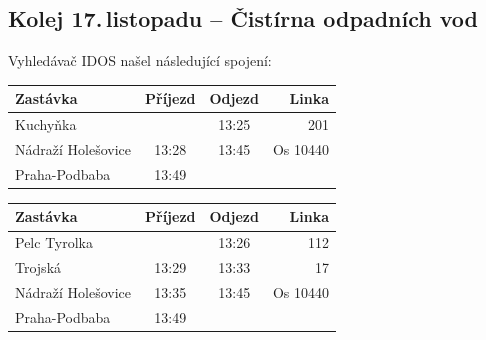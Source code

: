 \subsection{Kolej 17.\,listopadu -- Čistírna odpadních vod}
Vyhledávač IDOS našel následující spojení:

\begin{tabular}{|l|c|c|r|}\hline
{\bf Zastávka}&{\bf Příjezd}&{\bf Odjezd}&{\bf Linka}\\\hline
Kuchyňka&&13:25&201\\\hline
Nádraží Holešovice&13:28&13:45&Os 10440\\\hline
Praha-Podbaba&13:49&&\\\hline
\end{tabular} 

\begin{tabular}{|l|c|c|r|}\hline
{\bf Zastávka}&{\bf Příjezd}&{\bf Odjezd}&{\bf Linka}\\\hline
Pelc Tyrolka&&13:26&112\\\hline
Trojská&13:29&13:33&17\\\hline
Nádraží Holešovice&13:35&13:45&Os 10440\\\hline
Praha-Podbaba&13:49&&\\\hline
\end{tabular} 


